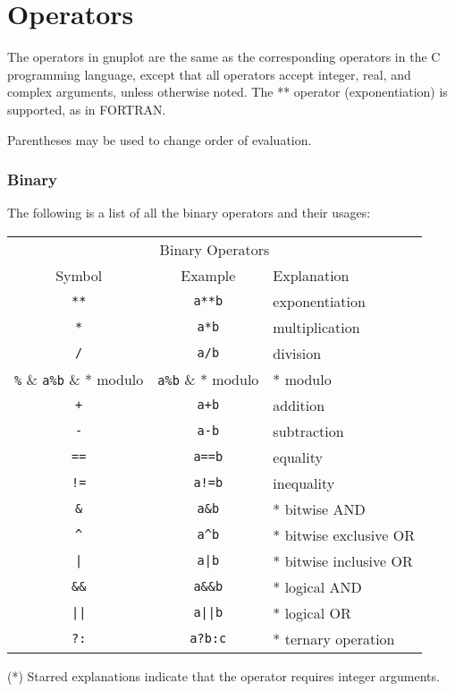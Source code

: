 \section{Operators}
The operators in gnuplot are the same as the corresponding operators
in the C programming language, except that all operators accept
integer, real, and complex arguments, unless otherwise noted.
The ** operator (exponentiation) is supported, as in FORTRAN.

Parentheses may be used to change order of evaluation.



\bye
\subsubsection{Binary}
The following is a list of all the binary operators and their
usages:


\begin{center}
\begin{tabular}{|ccl|} \hline
\multicolumn{3}{|c|}{Binary Operators} \\
Symbol & Example & Explanation \\ \hline
\verb~**~ & \verb~a**b~ & exponentiation\\
\verb~*~ & \verb~a*b~ & multiplication\\
\verb~/~ & \verb~a/b~ & division\\
\verb~%~ & \verb~a%b~ & * modulo\\
\verb~+~ & \verb~a+b~ & addition\\
\verb~-~ & \verb~a-b~ & subtraction\\
\verb~==~ & \verb~a==b~ & equality\\
\verb~!=~ & \verb~a!=b~ & inequality\\
\verb~&~ & \verb~a&b~ & * bitwise AND\\
\verb~^~ & \verb~a^b~ & * bitwise exclusive OR\\
\verb~|~ & \verb~a|b~ & * bitwise inclusive OR\\
\verb~&&~ & \verb~a&&b~ & * logical AND\\
\verb~||~ & \verb~a||b~ & * logical OR\\
\verb~?:~ & \verb~a?b:c~ & * ternary operation\\
\hline
\end{tabular}
\end{center}
(*) Starred explanations indicate that the operator requires
integer arguments.

